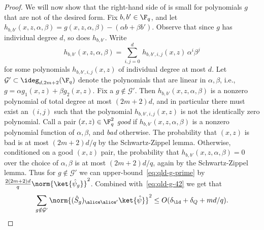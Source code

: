 \begin{proof}
	 We will now show that the right-hand side of  is small for polynomials $g$ that are not of the desired form. 
	Fix $b,b' \in \F_q$, and let $h_{b,b'}(x,z,\alpha,\beta) = g(x,z,\alpha,\beta) - (\alpha b + \beta b')$. Observe that since $g$ has individual degree $d$, so does $h_{b,b'}$. Write 
	\[
	h_{b,b'}(x,z,\alpha,\beta) = \sum_{i,j=0}^{d}\, h_{b,b',i,j}(x,z) \,  \alpha^i \beta^j 
	\]
	for some polynomials $h_{b,b',i,j}(x,z)$ of individual degree at most $d$. 
	Let $\mathcal{G}' \subset \ideg_{d,2m+2}(\F_q)$ denote the polynomials that are linear in $\alpha, \beta$, i.e., $g = \alpha g_1(x,z) + \beta g_2(x,z)$. Fix a $g \notin \mathcal{G}'$. Then $h_{b,b'}(x,z,\alpha,\beta)$ is a nonzero polynomial of total degree at most $(2m+2)d$, and in particular there must exist an $(i,j)$ such that the polynomial $h_{b,b',i,j}(x,z)$ is not the identically zero polynomial. Call a pair $(x,z) \in \F_q^2$ \emph{good} if $h_{b,b'}(x,z,\alpha,\beta)$ is a nonzero polynomial function of $\alpha,\beta$, and \emph{bad} otherwise. The probability that $(x,z)$ is bad is at most $(2m+2)d/q$ by the Schwartz-Zippel lemma. Otherwise, conditioned on a good $(x,z)$ pair, the probability that $h_{b,b'}(x,z,\alpha,\beta)=0$ over the choice of $\alpha,\beta$ is at most $(2m+2)d/q$, again by the Schwartz-Zippel lemma. Thus for $g \notin \mathcal{G}'$ we can upper-bound~\eqref{eq:qld-g-prime} by $\frac{2(2m+2)d}{q} \norm{ \ket{\hat{\psi}_g}}^2$. Combined with~\eqref{eq:qld-g-42} we get that
	\begin{equation}
	\label{eq:qld-g-prime-bound}
		\sum_{g \notin \mathcal{G}'} \norm{ (\hat{S}_g)_{\alice \alice'} \ket{\hat{\psi}}}^2 \leq O(\delta_\ld + \delta_Q + md/q).
	\end{equation}
	





\end{proof}
